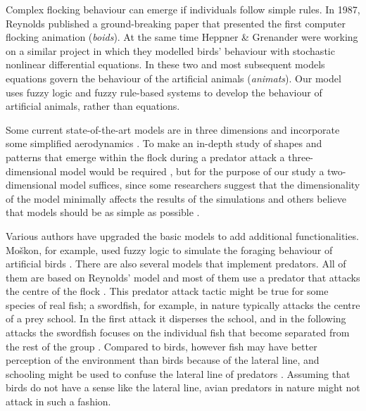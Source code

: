 Complex flocking behaviour can emerge if individuals follow simple rules. In 1987, Reynolds \cite{reynolds1987flocks} published a ground-breaking paper that presented the first computer flocking animation (\emph{boids}). At the same time Heppner \& Grenander \cite{heppner1990stochastic} were working on a similar project in which they modelled birds' behaviour with stochastic nonlinear differential equations. In these two and most subsequent models equations govern the behaviour of the artificial animals (\emph{animats}). Our model uses fuzzy logic \cite{zadeh1965fuzzy} and fuzzy rule-based systems \cite{mamdani1974application,dasilva2008predator} to develop the behaviour of artificial animals, rather than equations.

Some current state-of-the-art models are in three dimensions and incorporate some simplified aerodynamics \cite{hildenbrandt2010selforganized}. To make an in-depth study of shapes and patterns that emerge within the flock during a predator attack a three-dimensional model would be required \cite{hemelrijk2011somecauses}, but for the purpose of our study a two-dimensional model suffices, since some researchers suggest that the dimensionality of the model minimally affects the results of the simulations \cite{huth1992simulation,huth1994simulation,kunz2012simulations} and others believe that models should be as simple as possible \cite{czirok2000collective}.

Various authors have upgraded the basic models to add additional functionalities. Moškon\etal, for example, used fuzzy logic to simulate the foraging behaviour of artificial birds \cite{moskon2007fuzzy}. There are also several models that implement predators. All of them are based on Reynolds' model and most of them use a predator that attacks the centre of the flock \cite{inada2002order,lee2006dynamics}. This predator attack tactic 
might be true for some species of real fish; a swordfish, for example, in nature typically attacks the centre of a prey school. In the first attack it disperses the school, and in the following attacks the swordfish focuses on the individual fish that become separated from the rest of the group \cite{stephens2003modelling}. Compared to birds, however fish may have better perception of the environment than birds because of the lateral line, and schooling might be used to confuse the lateral line of predators \cite{larsson2009possible}. Assuming that birds do not have a sense like the lateral line, avian predators in nature might not attack in such a fashion.

